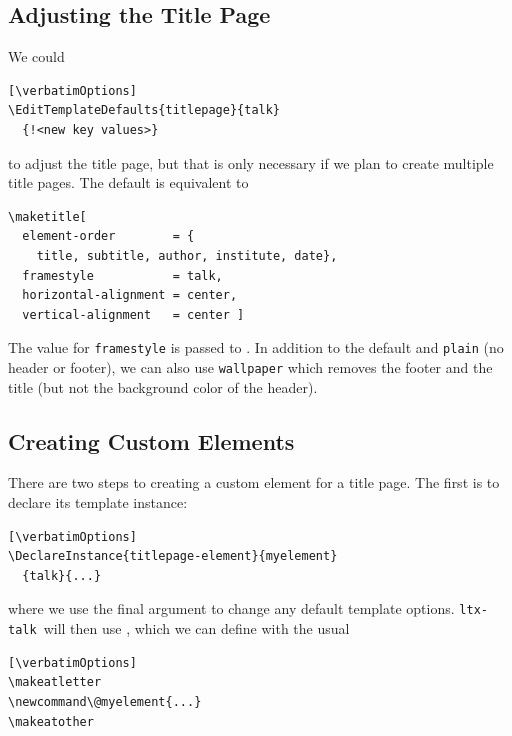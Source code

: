 \documentclass{ltugboat}
\newcommand{\verbatimOptions}{%
 \IfDocumentMetadataT{setup-code=}\small\makevmeta}
\newcommand{\ltxtalk}{\texttt{ltx-talk}}
\begin{document}
\subsection{Adjusting the Title Page}

We could
\begin{verbatim}[\verbatimOptions]
\EditTemplateDefaults{titlepage}{talk}
  {!<new key values>}
\end{verbatim}
to adjust the title page, but that is only necessary
if we plan to create multiple title pages.
The default  is equivalent to
\begin{lstlisting}
\maketitle[
  element-order        = {
    title, subtitle, author, institute, date},
  framestyle           = talk,
  horizontal-alignment = center,
  vertical-alignment   = center ]
\end{lstlisting}


The value for \texttt{framestyle} is passed to .
In addition to the default and \texttt{plain} (no header or footer),
we can also use \texttt{wallpaper} which removes the footer and the title
(but not the background color of the header).

\subsection{Creating Custom Elements}

There are two steps to creating a custom element for a title page.
The first is to declare its template instance:
\begin{verbatim}[\verbatimOptions]
\DeclareInstance{titlepage-element}{myelement}
  {talk}{...}
\end{verbatim}
where we use the final argument to change any default template options.
\ltxtalk\ will then use ,
which we can define with the usual
\begin{verbatim}[\verbatimOptions]
\makeatletter
\newcommand\@myelement{...}
\makeatother
\end{verbatim}

\end{document}
